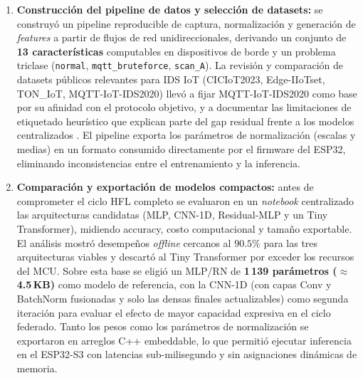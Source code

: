 \begin{enumerate}
    \item \textbf{Construcción del pipeline de datos y selección de datasets:} se construyó un pipeline reproducible de captura, normalización y generación de \emph{features} a partir de flujos de red unidireccionales, derivando un conjunto de \textbf{13 características} computables en dispositivos de borde y un problema triclase (\texttt{normal}, \texttt{mqtt\_bruteforce}, \texttt{scan\_A}). La revisión y comparación de datasets públicos relevantes para IDS IoT (CICIoT2023, Edge-IIoTset, TON\_IoT, MQTT-IoT-IDS2020) llevó a fijar MQTT-IoT-IDS2020 como base por su afinidad con el protocolo objetivo, y a documentar las limitaciones de etiquetado heurístico que explican parte del gap residual frente a los modelos centralizados \cite{Neto2023_CICIoT2023, Ferrag2022_EdgeIIoTset, Moustafa2020_TONIoT, Rani2024_IoT_IDS_Datasets}. El pipeline exporta los parámetros de normalización (escalas y medias) en un formato consumido directamente por el firmware del ESP32, eliminando inconsistencias entre el entrenamiento y la inferencia.

    \item \textbf{Comparación y exportación de modelos compactos:} antes de comprometer el ciclo HFL completo se evaluaron en un \emph{notebook} centralizado las arquitecturas candidatas (MLP, CNN-1D, Residual-MLP y un Tiny Transformer), midiendo accuracy, costo computacional y tamaño exportable. El análisis mostró desempeños \emph{offline} cercanos al $90.5\%$ para las tres arquitecturas viables y descartó al Tiny Transformer por exceder los recursos del MCU. Sobre esta base se eligió un MLP/RN de \textbf{1\,139 parámetros ($\approx$4.5\,KB)} como modelo de referencia, con la CNN-1D (con capas Conv y BatchNorm fusionadas y solo las densas finales actualizables) como segunda iteración para evaluar el efecto de mayor capacidad expresiva en el ciclo federado. Tanto los pesos como los parámetros de normalización se exportaron en arreglos C++ embeddable, lo que permitió ejecutar inferencia en el ESP32-S3 con latencias sub-milisegundo y sin asignaciones dinámicas de memoria.


\end{enumerate}
